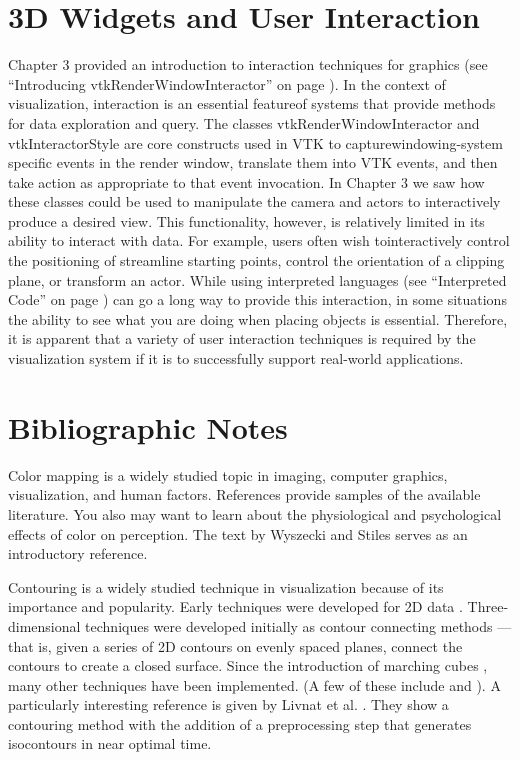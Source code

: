 	\section{3D Widgets and User Interaction}
	\label{sec:3dwui}
	Chapter 3 provided an introduction to interaction techniques for graphics (see ``Introducing vtkRenderWindowInteractor'' on page \pageref{pg:rwi} ).
	In the context of visualization, interaction is an essential featureof systems that provide methods for data exploration and query. The classes
	vtkRenderWindowInteractor and vtkInteractorStyle are core constructs used in VTK to capturewindowing-system specific events in the render window, translate them into VTK events, and then take action as appropriate to that event invocation.
	In Chapter 3 we saw how these classes could be used to manipulate the camera and actors to interactively produce a desired view. This functionality,
	however, is relatively limited in its ability to interact with data. For example, users often wish tointeractively control the positioning of streamline starting points, control the orientation of a clipping plane, or transform an actor. While using interpreted languages (see ``Interpreted Code'' on page \pageref{pg:rwi} ) can go a long way to provide this interaction, in some situations the ability to see what you are doing when placing objects is essential. Therefore, it is apparent that a variety of user interaction techniques is required by the visualization system if it is to successfully support real-world applications.

\section{Bibliographic Notes}
	
	Color mapping is a widely studied topic in imaging, computer graphics, visualization, and human factors. References \cite{Durrett87} \cite{Ware88} \cite{Rheingans92} provide samples of the available literature. You also may want to learn about the physiological and psychological effects of color on perception. The text by Wyszecki and Stiles \cite{Wyszecki82} serves as an introductory reference.
	
	Contouring is a widely studied technique in visualization because of its importance and popularity. Early techniques were developed for 2D data \cite{Watson92}. Three-dimensional techniques were developed initially as contour connecting methods \cite{Fuchs77} --- that is, given a series of 2D contours on evenly spaced planes, connect the contours to create a closed surface. Since the introduction of marching cubes \cite{Lorensen87}, many other techniques have been implemented. (A few of these include \cite{Nielson91} \cite{Montani94} and \cite{Durst88} ). A particularly interesting reference is given by Livnat et al. \cite{Livnat96}. They show a contouring method with the addition of a preprocessing step that generates isocontours in near optimal time.
	
